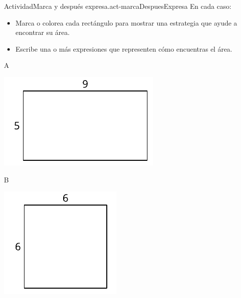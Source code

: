 \documentclass[14pt]{extarticle}
\begin{document}
\begin{activity}{Actividad}{Marca y después expresa.}{act-marcaDespuesExpresa}%
En cada caso:%
%
\begin{itemize}[label=\textbullet]
\item{}Marca o colorea cada rectángulo para mostrar una estrategia que ayude a encontrar su área.%
\item{}Escribe una o más expresiones que representen cómo encuentras el área.%
\end{itemize}
A%
\par
\includegraphics[scale=1.2, max width=\linewidth]{external/svg-source/tikz-file-153084.pdf}
\par\vspace{1cm}
B%
\par
\includegraphics[scale=1.2, max width=\linewidth]{external/svg-source/tikz-file-153085.pdf}

\end{activity}
\end{document}
